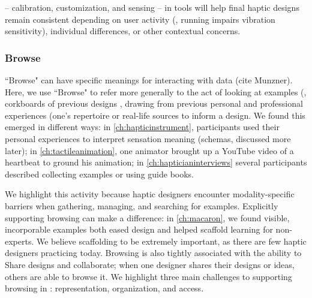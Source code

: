  -- calibration, customization, and sensing -- in tools will help final haptic designs remain consistent depending on user activity (\eg, running impairs vibration sensitivity), individual differences, or other contextual concerns.


%
%
\subsubsection{Browse} 
``Browse" can have specific meanings for interacting with data (cite Munzner).
Here, we use ``Browse" to refer more generally to the act of looking at examples (\eg, corkboards of previous designs \cite{Buxton2007}, drawing from previous personal and professional experiences (\eg one's repertoire \cite{Schon1982} or real-life sources to inform a design.
We found this emerged in different ways:
in \autoref{ch:hapticinstrument}, participants used their personal experiences to interpret sensation meaning (\ie schemas, discussed more later);
in \autoref{ch:tactileanimation}, one animator brought up a YouTube video of a heartbeat to ground his animation;
in \autoref{ch:hapticianinterviews} several participants described collecting examples or using guide books.

We highlight this activity because haptic designers encounter modality-specific barriers when gathering, managing, and searching for examples.
Explicitly supporting browsing can make a difference:
in \autoref{ch:macaron}, we found visible, incorporable examples both eased design and helped scaffold learning for non-experts.
We believe scaffolding to be extremely important, as there are few haptic designers practicing today.
Browsing is also tightly associated with the ability to Share designs and collaborate; when one designer shares their designs or ideas, others are able to browse it.
We highlight three main challenges to supporting browsing in \haxd: representation, organization, and access.





